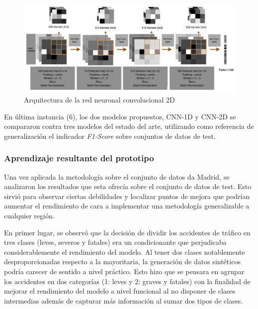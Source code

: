 \begin{figure}[H]
	\centering
	\includegraphics[width=15cm]{Figures/1stPaper/TASPCNN.png}
	\caption{Arquitectura de la red neuronal convolucional 2D}
	\label{TASPCNNIMAGE}
\end{figure}

En última instancia (6), los dos modelos propuestos, CNN-1D y CNN-2D se compararon contra tres modelos del estado del arte, utilizando como referencia de generalización el indicador \textit{F1-Score} sobre conjuntos de datos de test.


\subsubsection*{Aprendizaje resultante del prototipo}


Una vez aplicada la metodología sobre el conjunto de datos da Madrid, se analizaron los resultados que esta ofrecía sobre el conjunto de datos de test. Esto sirvió para observar ciertas debilidades y localizar puntos de mejora que podrían aumentar el rendimiento de cara a implementar una metodología generalizable a cualquier región.

En primer lugar, se observó que la decisión de dividir los accidentes de tráfico en tres clases (leves, severos y fatales) era un condicionante que perjudicaba considerablemente el rendimiento del modelo. Al tener dos clases notablemente desproporcionadas respecto a la mayoritaria, la generación de datos sintéticos podría carecer de sentido a nivel práctico. Esto hizo que se pensara en agrupar los accidentes en dos categorías (1: leves y 2: graves y fatales) con la finalidad de mejorar el rendimiento del modelo a nivel funcional al no disponer de clases intermedias además de capturar más información al sumar dos tipos de clases.

